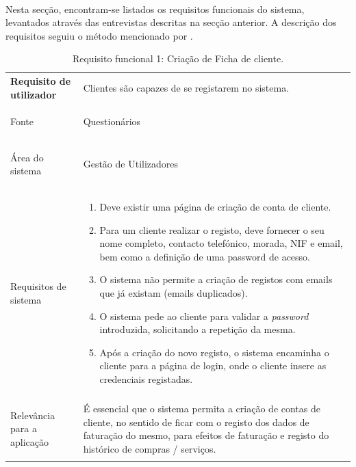 \documentclass[a4paper,12pt]{scrreprt}
\begin{document}
\paragraph{}Nesta secção, encontram-se listados os requisitos funcionais do sistema, levantados através das entrevistas descritas na secção anterior. A descrição dos requisitos seguiu o método mencionado por \citeauthor{sommerville2016} \citep[pp.~105--138]{sommerville2016}. 
\begin{table}[H]
    \centering
    \renewcommand{\arraystretch}{1.5} 
    
    \begin{tabular}{|>{\columncolor{gray!15}\bfseries}p{4cm}|p{10.5cm}|}
        \hline
        Requisito de utilizador & Clientes são capazes de se registarem no sistema. \\ \hdashline
        
        Fonte & Questionários \\ \hdashline
        
        Área do sistema & Gestão de Utilizadores \\ \hdashline
        
        Requisitos de sistema & 
        \begin{enumerate}[leftmargin=*, nosep, topsep=2pt, partopsep=0pt]
        
            \item Deve existir uma página de criação de conta de cliente.
            \item Para um cliente realizar o registo, deve fornecer o seu nome completo, contacto telefónico, morada, NIF e email, bem como a definição de uma password de acesso.
            \item O sistema não permite a criação de registos com emails que já existam (emails duplicados).
            \item O sistema pede ao cliente para validar a \textit{password} introduzida, solicitando a repetição da mesma.
            \item Após a criação do novo registo, o sistema encaminha o cliente para a página de login, onde o cliente insere as credenciais registadas.
        \end{enumerate} \\ \hdashline
        
        Relevância para a aplicação & É essencial que o sistema permita a criação de contas de cliente, no sentido de ficar com o registo dos dados de faturação do mesmo, para efeitos de faturação e registo do histórico de compras / serviços. \\ \hline
    \end{tabular}
    \caption{Requisito funcional 1: Criação de Ficha de cliente.}
    \label{tab:rf1}
\end{table}
\end{document}
